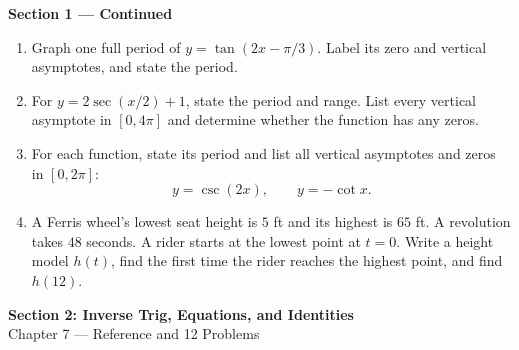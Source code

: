 \documentclass[11pt]{article}
\begin{document}
\newpage
\begin{center}{\large\textbf{Section 1 --- Continued}}\end{center}
\begin{enumerate}[leftmargin=*,itemsep=0pt,resume=chapterSix]
  \item Graph one full period of $y=\tan(2x-\pi/3)$.
  Label its zero and vertical asymptotes, and state the period.
  \par{}

  \item For $y=2\sec(x/2)+1$, state the period and range. List every vertical
  asymptote in $[0,4\pi]$ and determine whether the function has any zeros.
  \par{}

  \item For each function, state its period and list all vertical asymptotes
  and zeros in $[0,2\pi]$:
  \[
    y=\csc(2x),\qquad y=-\cot x.
  \]
  \par{}

  \item A Ferris wheel's lowest seat height is $5$ ft and its highest is
  $65$ ft. A revolution takes $48$ seconds. A rider starts at the lowest
  point at $t=0$. Write a height model $h(t)$, find the first time the rider
  reaches the highest point, and find $h(12)$.
  \par{}
\end{enumerate}

\newpage
\begin{center}
  {\Large\textbf{Section 2: Inverse Trig, Equations, and Identities}}\\[3pt]
  Chapter 7 --- Reference and 12 Problems
\end{center}
\end{document}
